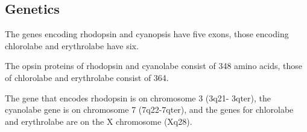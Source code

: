 \subsection*{Genetics}

\be

\item The genes encoding rhodopsin and cyanopsis have five exons, those
encoding chlorolabe and erythrolabe have six.

\item The opsin proteins of rhodopsin and cyanolabe consist of 348 amino
acids, those of chlorolabe and erythrolabe consist of 364.

\item The gene that encodes rhodopsin is on chromosome 3 (3q21- 3qter), the
cyanolabe gene is on chromosome 7 (7q22-7qter), and the genes for
chlorolabe and erythrolabe are on the X chromosome (Xq28).

\ee
